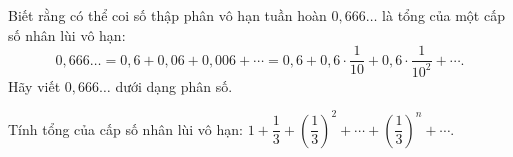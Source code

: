 \begin{bt}%
	Biết rằng có thể coi số thập phân vô hạn tuần hoàn $0{,}666 \ldots$ là tổng của một cấp số nhân lùi vô hạn:
	\[ 0{,}666 \ldots=0{,}6+0{,}06+0{,}006+\cdots=0{,}6+0{,}6 \cdot \dfrac{1}{10}+0{,}6 \cdot \dfrac{1}{10^2}+\cdots.
	\]
	Hãy viết $0{,}666 \ldots$ dưới dạng phân số.
\end{bt}

\begin{bt}%
	Tính tổng của cấp số nhân lùi vô hạn: $1+\dfrac{1}{3}+\left(\dfrac{1}{3}\right)^2+\cdots+\left(\dfrac{1}{3}\right)^n+\cdots$.	
\end{bt}

